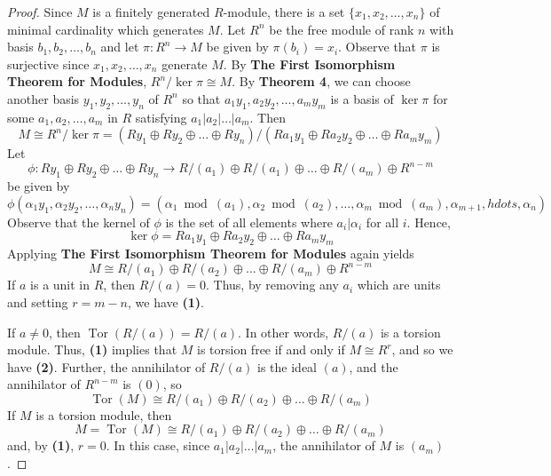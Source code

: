 \documentclass[12pt,leqno]{article}
\numberwithin{equation}{section}
\theoremstyle{definition}
\newcommand{\Tor}{\operatorname{Tor}}
\begin{document}
\begin{proof}
 Since $M$ is a finitely generated $R$-module, there is a set $\{x_1,x_2,\hdots,x_n\}$ of minimal cardinality which generates $M$. Let $R^n$ be the free module of rank $n$ with basis $b_1,b_2,\hdots,b_n$ and let $\pi:R^n\to M$ be given by $\pi(b_i)=x_i$. Observe that $\pi$ is surjective since $x_1,x_2,\hdots,x_n$ generate $M$. By \textbf{The First Isomorphism Theorem for Modules}, $R^n/\ker\pi\cong M$. By \textbf{Theorem 4}, we can choose another basis $y_1,y_2,\hdots,y_n$ of $R^n$ so that $a_1y_1,a_2y_2,\hdots,a_my_m$ is a basis of $\ker\pi$ for some $a_1,a_2,\hdots,a_m$ in $R$ satisfying $a_1|a_2|\hdots|a_m$. Then \[M\cong R^n/\ker\pi=(Ry_1\oplus Ry_2\oplus\hdots\oplus Ry_n)/(Ra_1y_1\oplus Ra_2y_2\oplus\hdots\oplus Ra_my_m)\] Let \[\phi:Ry_1\oplus Ry_2\oplus\hdots\oplus Ry_n\to R/(a_1)\oplus R/(a_1)\oplus\hdots\oplus R/(a_m)\oplus R^{n-m}\] be given by \[\phi(\alpha_1y_1,\alpha_2y_2,\hdots,\alpha_ny_n)=(\alpha_1\bmod{(a_1)},\alpha_2\bmod{(a_2)},\hdots,\alpha_m\bmod{(a_m)},\alpha_{m+1},hdots,\alpha_n)\] Observe that the kernel of $\phi$ is the set of all elements where $a_i|\alpha_i$ for all $i$. Hence, \[\ker\phi=Ra_1y_1\oplus Ra_2y_2\oplus\hdots\oplus Ra_my_m\] Applying \textbf{The First Isomorphism Theorem for Modules} again yields \[M\cong R/(a_1)\oplus R/(a_2)\oplus\hdots\oplus R/(a_m)\oplus R^{n-m}\] If $a$ is a unit in $R$, then $R/(a)=0$. Thus, by removing any $a_i$ which are units and setting $r=m-n$, we have \textbf{(1)}.

If $a\not=0$, then $\Tor(R/(a))=R/(a)$. In other words, $R/(a)$ is a torsion module. Thus, \textbf{(1)} implies that $M$ is torsion free if and only if $M\cong R^r$, and so we have \textbf{(2)}. Further, the annihilator of $R/(a)$ is the ideal $(a)$, and the annihilator of $R^{n-m}$ is $(0)$, so \[\Tor(M)\cong R/(a_1)\oplus R/(a_2)\oplus\hdots\oplus R/(a_m)\] If $M$ is a torsion module, then \[M=\Tor(M)\cong R/(a_1)\oplus R/(a_2)\oplus\hdots\oplus R/(a_m)\] and, by \textbf{(1)}, $r=0$. In this case, since $a_1|a_2|\hdots|a_m$, the annihilator of $M$ is $(a_m)$.
\end{proof}
\end{document}
